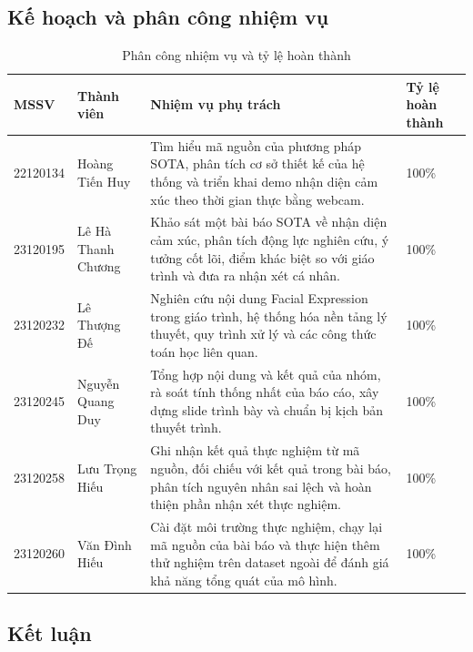 \subsection{Kế hoạch và phân công nhiệm vụ}
\begin{table}[H]
    \centering
    \caption{Phân công nhiệm vụ và tỷ lệ hoàn thành}
    \begin{tabularx}{\textwidth}{C{2.3cm} L{3.2cm} X C{2.0cm}}
        \toprule
        \textbf{MSSV} & \textbf{Thành viên} & \textbf{Nhiệm vụ phụ trách} & \textbf{Tỷ lệ hoàn thành} \\
        \midrule

        22120134 & Hoàng Tiến Huy 
        & Tìm hiểu mã nguồn của phương pháp SOTA, phân tích cơ sở thiết kế của hệ thống và triển khai demo nhận diện cảm xúc theo thời gian thực bằng webcam.
        & 100\% \\

        23120195 & Lê Hà Thanh Chương
        & Khảo sát một bài báo SOTA về nhận diện cảm xúc, phân tích động lực nghiên cứu, ý tưởng cốt lõi, điểm khác biệt so với giáo trình và đưa ra nhận xét cá nhân.
        & 100\% \\

        23120232 & Lê Thượng Đế
        & Nghiên cứu nội dung Facial Expression trong giáo trình, hệ thống hóa nền tảng lý thuyết, quy trình xử lý và các công thức toán học liên quan.
        & 100\% \\

        23120245 & Nguyễn Quang Duy
        & Tổng hợp nội dung và kết quả của nhóm, rà soát tính thống nhất của báo cáo, xây dựng slide trình bày và chuẩn bị kịch bản thuyết trình.
        & 100\% \\

        23120258 & Lưu Trọng Hiếu
        & Ghi nhận kết quả thực nghiệm từ mã nguồn, đối chiếu với kết quả trong bài báo, phân tích nguyên nhân sai lệch và hoàn thiện phần nhận xét thực nghiệm.
        & 100\% \\

        23120260 & Văn Đình Hiếu
        & Cài đặt môi trường thực nghiệm, chạy lại mã nguồn của bài báo và thực hiện thêm thử nghiệm trên dataset ngoài để đánh giá khả năng tổng quát của mô hình.
        & 100\% \\

        \bottomrule
    \end{tabularx}
\end{table}

\subsection{Kết luận}

